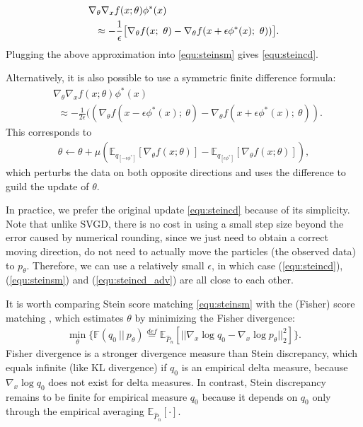 \documentclass[12pt,paper=letter]{scrreprt}
\def\mbb#1{\mathbb{#1}}
\def\E{\mbb{E}} %
\newcommand{\ff}{\phi}
\begin{document}

\iffalse 
\begin{align}%
& \nabla_\theta \nabla_x f(x; \theta) \ff^*(x)   \notag \\
&~~ \approx  - \frac{1}{\epsilon}\big[ \nabla_\theta  f(x; ~\theta)  - \nabla_\theta f (x + \epsilon \ff^*(x); ~\theta)) \big]. 
\label{equ:adfd}
\end{align}
Plugging the above approximation into \eqref{equ:steinsm} gives \eqref{equ:steincd}. 

Alternatively, it is also possible to use a symmetric finite difference formula:
\begin{align*}%
& \nabla_\theta \nabla_x  f(x; \theta) \ff^*(x)   \\
&~~ \approx  -\frac{1}{2\epsilon} ((\nabla_\theta  f(x - \epsilon \ff^*(x); ~\theta)  - \nabla_\theta f (x + \epsilon \ff^*(x); ~\theta)). 
\end{align*}
This corresponds to 
\begin{align}\label{equ:steincd_adv}
\theta \gets \theta + \mu(\E_{q_{[-\epsilon\ff^*]}}[\nabla_\theta f(x ; \theta)] - \E_{q_{[\epsilon \ff^*]}}[\nabla_\theta f(x ; \theta)]),
\end{align}
which perturbs the data on both opposite directions and uses the difference to guild the update of $\theta$. 

In practice, we prefer the original update \eqref{equ:steincd} %
because of its simplicity. 
Note that unlike SVGD, there is no cost in using a small step size beyond the error caused by numerical rounding, 
since we just need to obtain a correct moving direction, do not need to actually move the particles (the observed data) to $p_\theta$. %
Therefore, we can use a relatively small $\epsilon$,  in which case (\ref{equ:steincd}), (\ref{equ:steinsm}) and (\ref{equ:steincd_adv}) are all close to each other. 

It is worth comparing Stein score matching \eqref{equ:steinsm} 
with the (Fisher) score matching \citep{hyvarinen2005estimation}, which estimates $\theta$ by minimizing the Fisher divergence:
\begin{align}\label{equ:fisher}
\!\!\!\min_\theta\big\{ \mathbb F(q_0 ~||~ p_\theta) \overset{def}{=} \E_{\hat P_n}[||\nabla_x \log q_0 - \nabla_x \log p_\theta||^2_2]\big\}. 
\end{align}
Fisher divergence is a stronger divergence measure than Stein discrepancy, which 
equals infinite (like KL divergence) if $q_0$ is an empirical delta measure, because $\nabla_x\log q_0$ does not exist for delta measures. 
In contrast, Stein discrepancy remains to be finite for empirical measure $q_0$ because it depends on $q_0$ only through the empirical averaging $\E_{\hat P_n}[\cdot]$. 
\end{document}
